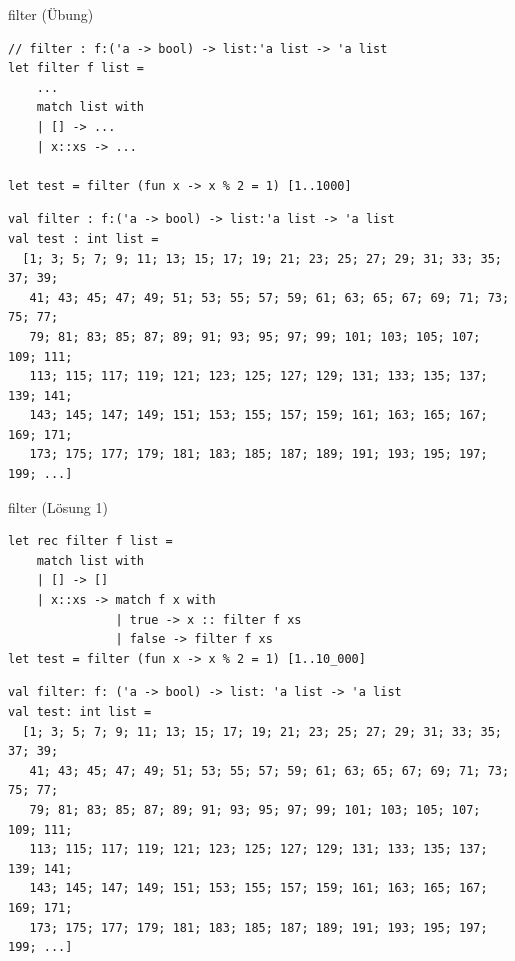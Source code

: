 \documentclass[t]{beamer}
\begin{document}
\begin{frame}[label={sec:org1b94b36},fragile]{filter (Übung)}
 \begin{verbatim}
// filter : f:('a -> bool) -> list:'a list -> 'a list
let filter f list =
    ...
    match list with
    | [] -> ...
    | x::xs -> ...

let test = filter (fun x -> x % 2 = 1) [1..1000]
\end{verbatim}

\begin{verbatim}
val filter : f:('a -> bool) -> list:'a list -> 'a list
val test : int list =
  [1; 3; 5; 7; 9; 11; 13; 15; 17; 19; 21; 23; 25; 27; 29; 31; 33; 35; 37; 39;
   41; 43; 45; 47; 49; 51; 53; 55; 57; 59; 61; 63; 65; 67; 69; 71; 73; 75; 77;
   79; 81; 83; 85; 87; 89; 91; 93; 95; 97; 99; 101; 103; 105; 107; 109; 111;
   113; 115; 117; 119; 121; 123; 125; 127; 129; 131; 133; 135; 137; 139; 141;
   143; 145; 147; 149; 151; 153; 155; 157; 159; 161; 163; 165; 167; 169; 171;
   173; 175; 177; 179; 181; 183; 185; 187; 189; 191; 193; 195; 197; 199; ...]
\end{verbatim}
\end{frame}

\begin{frame}[label={sec:org933111b},fragile]{filter (Lösung 1)}
 \begin{verbatim}
let rec filter f list = 
    match list with
    | [] -> []
    | x::xs -> match f x with
               | true -> x :: filter f xs
               | false -> filter f xs
let test = filter (fun x -> x % 2 = 1) [1..10_000]
\end{verbatim}

\begin{verbatim}
val filter: f: ('a -> bool) -> list: 'a list -> 'a list
val test: int list =
  [1; 3; 5; 7; 9; 11; 13; 15; 17; 19; 21; 23; 25; 27; 29; 31; 33; 35; 37; 39;
   41; 43; 45; 47; 49; 51; 53; 55; 57; 59; 61; 63; 65; 67; 69; 71; 73; 75; 77;
   79; 81; 83; 85; 87; 89; 91; 93; 95; 97; 99; 101; 103; 105; 107; 109; 111;
   113; 115; 117; 119; 121; 123; 125; 127; 129; 131; 133; 135; 137; 139; 141;
   143; 145; 147; 149; 151; 153; 155; 157; 159; 161; 163; 165; 167; 169; 171;
   173; 175; 177; 179; 181; 183; 185; 187; 189; 191; 193; 195; 197; 199; ...]
\end{verbatim}
\end{frame}
\end{document}
